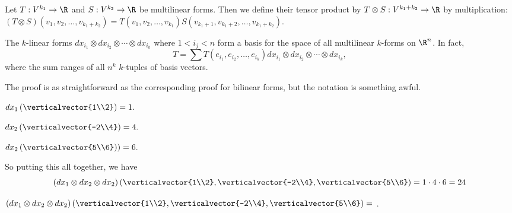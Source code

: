 \documentclass{ximera}
\begin{document}
\begin{definition}
  Let $T:V^{k_1} \to \R$ and $S:V^{k_2} \to \R$ be multilinear forms.  Then we define their tensor product by $T \otimes S: V^{k_1 + k_2} \to \R$ by multiplication:
  $(T \otimes S)(v_1,v_2, \ldots ,v_{k_1+k_2}) = T(v_1,v_2, \ldots ,v_{k_1})S(v_{k_1+1},v_{k_1+2}, \ldots ,v_{k_1+k_2})$.
\end{definition}

\begin{theorem}
  The $k$-linear forms $dx_{i_1} \otimes dx_{i_2} \otimes \cdots \otimes dx_{i_k}$ where $1<i_j<n $ form a basis for the space of all multilinear $k$-forms on $\R^n$.  In fact,
  \[
  T = \sum T(e_{i_1},e_{i_2}, \ldots ,e_{i_k}) dx_{i_1} \otimes dx_{i_2} \otimes \cdots \otimes dx_{i_k},
  \]
  where the sum ranges of all $n^k$  $k$-tuples of basis vectors.
\end{theorem}

The proof is as straightforward as the corresponding proof for bilinear forms, but the notation is something awful.

\begin{question}
  \begin{solution}
    \begin{hint}
      \(dx_1 \left(\verticalvector{1\\2}\right) = 1.\)
    \end{hint}
    \begin{hint}
      \(dx_2 \left(\verticalvector{-2\\4}\right) = 4.\)
    \end{hint}
    \begin{hint}
      \(dx_2 \left(\verticalvector{5\\6}\right)) = 6.\)
    \end{hint}
    \begin{hint}
      So putting this all together, we have
      \[
      \left(dx_1 \otimes dx_2 \otimes dx_2\right) \left(\verticalvector{1\\2},\verticalvector{-2\\4},\verticalvector{5\\6}\right) = 1 \cdot 4 \cdot 6 = 24
      \]
    \end{hint}
    $\left( dx_1 \otimes dx_2 \otimes dx_2 \right) \left(\verticalvector{1\\2},\verticalvector{-2\\4},\verticalvector{5\\6}\right) = $ .
  \end{solution}
\end{question}
\end{document}
